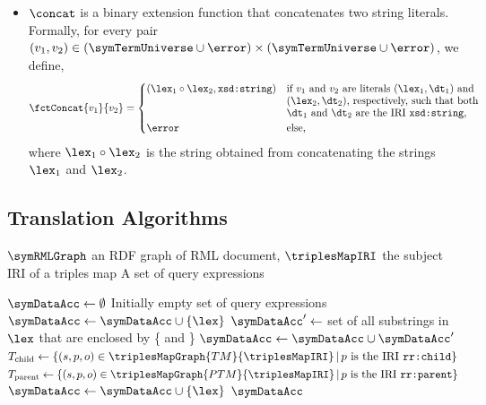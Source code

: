 \begin{itemize}
	\item
	$\concat$ is a binary extension function that concatenates two string literals. Formally, for every pair $(v_1, v_2) \in (\symTermUniverse \cup \error) \times (\symTermUniverse \cup \error)$, we define,
\begin{equation*}
    \fctConcat{v_1}{v_2} = 
    \begin{cases}
        (\lex_1 \circ \lex_2, \texttt{xsd:string})  &\text{if $v_1$ and $v_2$ are literals $(\lex_1,\dt_1)$ and}
		\\[-1mm]
        & \text{$(\lex_2,\dt_2)$, respectively, such that both}
		\\[-1mm]
        & \text{$\dt_1$ and $\dt_2$ are the IRI \texttt{xsd:string},}
        \\ 
        \error &\text{else,}
		\\
    \end{cases}
\end{equation*}
where $\lex_1 \circ \lex_2$ is the string obtained from concatenating the strings $\lex_1$ and $\lex_2$.

\end{itemize}


\subsection{Translation Algorithms}%
\label{sub:translation_algorithms}



\begin{algorithm}[htbp]
	\caption{QueryInTriplesMap: Extract query expressions from RML triples maps}
	\label{alg:query_extraction}
	\begin{algorithmic}[1]
		\Require  $\symRMLGraph$ an RDF graph of RML document,
		\Statex  \qquad $\triplesMapIRI$ the subject IRI of a triples map
		\Ensure  A set of query expressions

		\State $\symDataAcc \gets \emptyset$ \Comment Initially empty set of query expressions
		    \State $\symDataAcc \gets \symDataAcc \cup \{ \lex \}$
		\EndFor
		    \State $\symDataAcc' \gets$ set of all substrings in $\lex$ that are enclosed by \{ and \}
		    \State $\symDataAcc \gets \symDataAcc \cup \symDataAcc'$
		\EndFor
		\State $T_\textrm{child} \gets \{ (s,p,o) \in \triplesMapGraph{TM}{\triplesMapIRI} \, | \, p \text{ is the IRI } \texttt{rr:child} \}$
		\State $T_\textrm{parent} \gets \{(s,p,o) \in \triplesMapGraph{PTM}{\triplesMapIRI} \, | \, p \text{ is the IRI } \texttt{rr:parent} \}$
		    \State $\symDataAcc \gets \symDataAcc \cup \{ \lex \}$
		\EndFor
		\State \Return $\symDataAcc$
	\end{algorithmic}
\end{algorithm}


